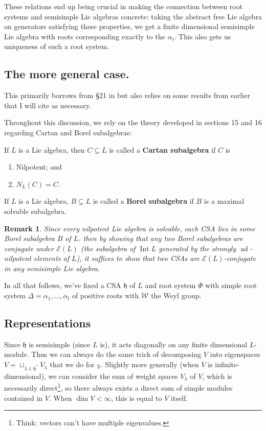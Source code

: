 \documentclass[12pt]{article}
\theoremstyle{nonumberbreak}
\theoremstyle{changebreak}
\theoremstyle{nonumberplain}
\theoremstyle{change}
\newtheorem{rmk}[thm]{Remark}
\newcommand*{\h}{\mathfrak{h}}
\let\sl\relax
\newcommand*{\sl}{\mathfrak{sl}}
\DeclareMathOperator{\ad}{ad}
\DeclareMathOperator{\Int}{Int}
\begin{document}
These relations end up being crucial in making the connection between root systems and semisimple Lie algebras concrete:
taking the abstract free Lie algebra on generators satisfying these properties, we get a finite dimensional semisimple Lie algebra
with roots corresponding exactly to the $\alpha_i$. This also gets us uniqueness of such a root system.

\subsection{The more general case.}
This primarily borrows from \S 21 in \cite{humphreys1} but also relies on some results from earlier that I will cite as 
necessary. 

Throughout this discussion, we rely on the theory developed in sections 15 and 16 regarding Cartan and Borel subalgebras:
\begin{defn}
	If $L$ is a Lie algebra, then $C\subseteq L$ is called a \textbf{Cartan subalgebra} if $C$ is
	\begin{enumerate}
		\item Nilpotent; and
		\item $N_L(C)=C$.
	\end{enumerate}
\end{defn}
\begin{defn}
	If $L$ is a Lie algebra, $B\subseteq L$ is called a \textbf{Borel subalgebra} if $B$ is a
	maximal solvable subalgebra.
\end{defn}
\begin{rmk}
	Since every nilpotent Lie algebra is solvable, each CSA lies in some Borel subalgebra $B$ of $L$.
	then by showing that any two Borel subalgebras are conjugate under $\mathscr{E}(L)$ (the subalgebra of $\Int L$ generated
	by the strongly $\ad$-nilpotent elements of $L$), it suffices to 
	show that two CSAs are $\mathscr{E}(L)$-conjugate in any \textit{semisimple} Lie algebra.
\end{rmk}

In all that follows, we've fixed a CSA $\h$ of $L$ and root system $\Phi$ with simple root system $\Delta=\alpha_1,\dots,\alpha_l$
of positive roots with $\mathcal{W}$ the Weyl group.

\subsection{Representations}
Since $\h$ is semisimple (since $L$ is), it acts diagonally on any finite dimensional $L$-module. Thus we can always
do the same trick of decomposing $V$ into eigenspaces $V=\sqcup_{\lambda\in \h^*}V_\lambda$ that we do for $\sl_2$.
Slightly more generally (when $V$ is infinite-dimensional), we can consider the sum of weight spaces $V_\lambda$ of $V$, 
which is necessarily  direct\footnote{Think: vectors can't have multiple eigenvalues.}, so there always
exists a direct sum of simple modules contained in $V$. When $\dim V<\infty$, this is equal to $V$ itself.
\end{document}
